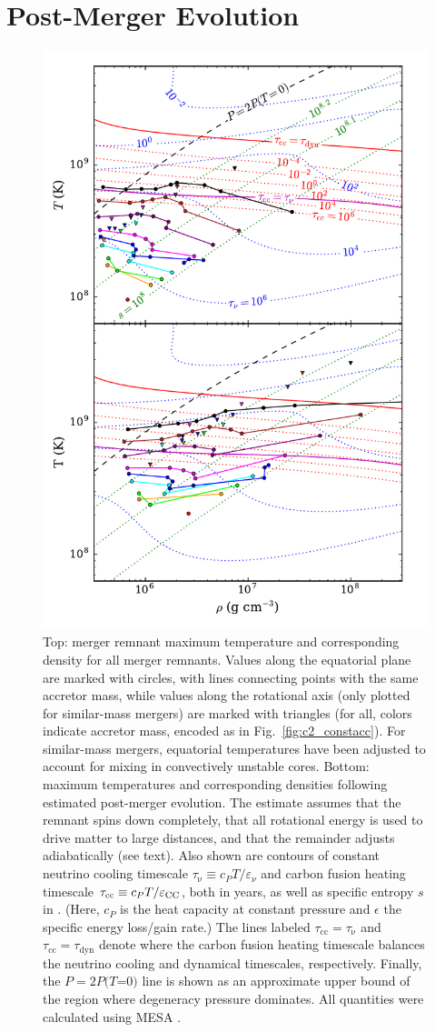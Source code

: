 \section{Post-Merger Evolution}
\label{sec:c2_postmerger}

\begin{figure}
\centering
\includegraphics[angle=0,width=0.7\columnwidth]{chapter2_zhu+13/figures/Willitexplode.pdf}
\caption{Top: merger remnant maximum temperature {\Tmax} and corresponding density {\rhoTmax} for all merger remnants.  Values along the equatorial plane are marked with circles, with lines connecting points with the same accretor mass, while values along the rotational axis (only plotted for similar-mass mergers) are marked with triangles (for all, colors indicate accretor mass, encoded as in Fig.~\ref{fig:c2_constacc}).  For similar-mass mergers, equatorial temperatures have been adjusted to account for mixing in convectively unstable cores.  Bottom: maximum temperatures and corresponding densities following estimated post-merger evolution.  The estimate assumes that the remnant spins down completely, that all rotational energy is used to drive matter to large distances, and that the remainder adjusts adiabatically (see text).  Also shown are contours of constant neutrino cooling timescale $\tau_\mathrm{\nu}\equiv c_P T/\varepsilon_\nu$ and carbon fusion heating timescale $\tau_\mathrm{cc}\equiv c_P T/\varepsilon_{\rm CC}$, both in years, as well as specific entropy $s$ in \ergpKg.  (Here, $c_P$ is the heat capacity at constant pressure and $\epsilon$ the specific energy loss/gain rate.)  The lines labeled $\tau_\mathrm{cc} = \tau_\mathrm{\nu}$ and $\tau_\mathrm{cc} = \tau_\mathrm{dyn}$ denote where the carbon fusion heating timescale balances the neutrino cooling and dynamical timescales, respectively.  Finally, the $P = 2P(T$=$0)$ line is shown as an approximate upper bound of the region where degeneracy pressure dominates.  All quantities were calculated using MESA \citep{paxt+11}.}

\end{figure}
